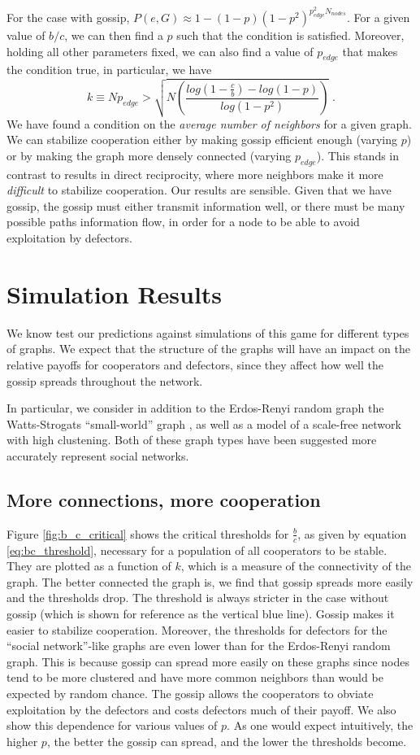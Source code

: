 \documentclass{article}
\renewcommand{\=}[1]{\stackrel{#1}{=}} %
\begin{document}
For the case with gossip, $P(e,G) \approx 1 - (1-p)(1-p^2)^{p_{edge}^2N_{nodes}}$. For a given value of $b/c$, we can then find a $p$ such that the condition is satisfied. Moreover, holding all other parameters fixed, we can also find a value of $p_{edge}$ that makes the condition true, in particular, we have
$$k \equiv N p_{edge} > \sqrt{N  \left(\frac{log(1 - \frac{c}{b}) - log(1 - p)}{log(1 - p^2)}\right)}\;.$$
We have found a condition on the \emph{average number of neighbors} for a given graph. We can stabilize cooperation either by making gossip efficient enough (varying $p$) or by making the graph more densely connected (varying $p_{edge}$). This stands in contrast to results in direct reciprocity, where more neighbors make it more \emph{difficult} to stabilize cooperation. Our results are sensible. Given that we have gossip, the gossip must either transmit information well, or there must be many possible paths information flow, in order for a node to be able to avoid exploitation by defectors. 

\section{Simulation Results}
We know test our predictions against simulations of this game for different types of graphs. We expect that the structure of the graphs will have an impact on the relative payoffs for cooperators and defectors, since they affect how well the gossip spreads throughout the network.

In particular, we consider in addition to the Erdos-Renyi random graph the Watts-Strogats ``small-world'' graph \cite{watts1998collective}, as well as a model of a scale-free network \cite{holme2002growing} with high clustening. Both of these graph types have been suggested more accurately represent social networks.

\subsection{More connections, more cooperation}

Figure \ref{fig:b_c_critical} shows the critical thresholds for $\frac{b}{c}$, as given by equation \ref{eq:bc_threshold}, necessary for a population of all cooperators to be stable. They are plotted as a function of $k$, which is a measure of the connectivity of the graph. The better connected the graph is, we find that gossip spreads more easily and the thresholds drop. The threshold is always stricter in the case without gossip (which is shown for reference as the vertical blue line). Gossip makes it easier to stabilize cooperation. Moreover, the thresholds for defectors for the ``social network''-like graphs are even lower than for the Erdos-Renyi random graph. This is because gossip can spread more easily on these graphs since nodes tend to be more clustered and have more common neighbors than would be expected by random chance. The gossip allows the cooperators to obviate exploitation by the defectors and costs defectors much of their payoff. We also show this dependence for various values of $p$. As one would expect intuitively, the higher $p$, the better the gossip can spread, and the lower the thresholds become.
\end{document}
